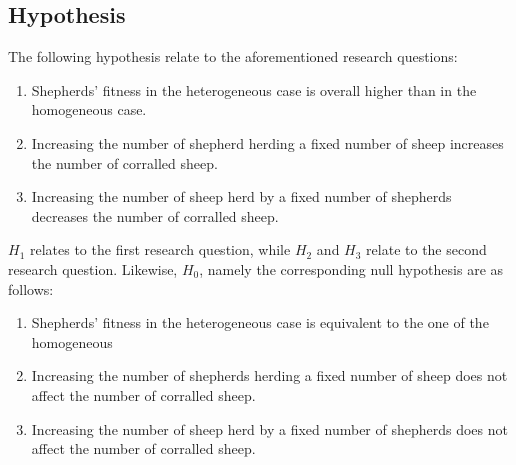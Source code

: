 \documentclass[conference]{IEEEtran}
\begin{document}
\subsection{Hypothesis}
\label{sec:hypothesis}
The following hypothesis relate to the aforementioned research questions:

\begin{enumerate}
	\item Shepherds' fitness in the heterogeneous case is overall higher than in the homogeneous case.
	\item Increasing the number of shepherd herding a fixed number of sheep increases the number of corralled sheep.
	\item Increasing the number of sheep herd by a fixed number of shepherds decreases the number of corralled sheep.
\end{enumerate}
$H_1$ relates to the first research question, while $H_2$ and $H_3$ relate to the second research question. 
Likewise, $H_0$, namely the corresponding null hypothesis are as follows:

\begin{enumerate}
	\item Shepherds' fitness in the heterogeneous case is equivalent to the one of the homogeneous
	\item Increasing the number of shepherds herding a fixed number of sheep does not affect the number of corralled sheep.
	\item Increasing the number of sheep herd by a fixed number of shepherds does not affect the number of corralled sheep.
\end{enumerate}
\end{document}
